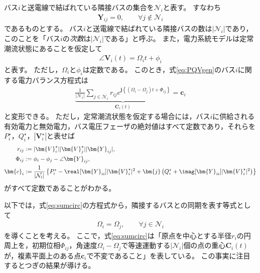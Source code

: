 \documentclass[tombow,dvipdfmx]{corona-a5-1.1}
\begin{document}
バス$i$と送電線で結ばれている隣接バスの集合を$\mathcal{N}_i$と表す。
すなわち
\begin{align*}
\bm{Y}_{ij} = 0,\qquad \forall j \notin \mathcal{N}_i
\end{align*}
であるものとする。
バス$i$と送電線で結ばれている隣接バスの数は$|\mathcal{N}_i|$であり，このことを「バス$i$の\emph{次数}は$|\mathcal{N}_i|$である」と呼ぶ。
また，電力系統モデルは定常潮流状態にあることを仮定して
\begin{align*}
\angle \bm{V}_i (t) = \Omega_i t +\phi_i
\end{align*}
と表す。
ただし，$\Omega_i$と$\phi_i$は定数である。
このとき，式\ref{eq:PQVgen}のバス$i$に関する電力バランス方程式は
\begin{align}\label{eq:sumcirc}
\underbrace{
\frac{1}{|\mathcal{N}_i|}\sum_{j \in \mathcal{N}_i } 
r_{ij}
e^{\bm{j} 
\left\{
(\Omega_i - \Omega_j)t + 
\Phi_{ij}
\right\} }
}_{\bm{C}_i (t)}
= \bm{c}_i
\end{align}
と変形できる。
ただし，定常潮流状態を仮定する場合には，バス$i$に供給される有効電力と無効電力，バス電圧フェーザの絶対値はすべて定数であり，それらを$P_i^{\star}$，$Q_i^{\star}$，$|\bm{V}_i^{\star}|$と表せば
\begin{align*}
r_{ij} &:=|\bm{V}_i^{\star}| |\bm{V}_j^{\star}| |\bm{Y}_{ij}|, 
\\
\Phi_{ij} &:= \phi_i - \phi_j - \angle \bm{Y}_{ij},
\\
\bm{c}_i &:=  \frac{1}{|\mathcal{N}_i|}
\left\{
P_i^{\star} - \real[\bm{Y}_{ii}] |\bm{V}_i^{\star}|^2
+ \bm{j}
\left(
Q_i^{\star} + \imag [\bm{Y}_{ii}] |\bm{V}_i^{\star}|^2
\right)
\right\}
\end{align*}
がすべて定数であることがわかる。

以下では，式\ref{eq:sumcirc}の方程式から，隣接するバスとの同期を表す等式として
\begin{align}\label{eq:alloms}
\Omega_i = \Omega_{j} 
,\qquad 
\forall j\in \mathcal{N}_i
\end{align}
を導くことを考える。
ここで，式\ref{eq:sumcirc}は「原点を中心とする半径$r_i$の円周上を，初期位相$\Phi_{ij}$，角速度$\Omega_i-\Omega_j$で等速運動する$|\mathcal{N}_i|$個の点の重心$\bm{C}_i (t)$が，複素平面上のある点$\bm{c}_i$で不変であること」を表している。
この事実に注目するとつぎの結果が導ける。
\end{document}

